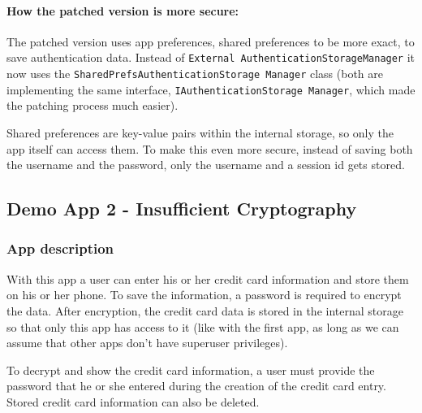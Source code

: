 \paragraph{How the patched version is more secure:}
The patched version uses app preferences, shared preferences to be more exact, to save authentication data. Instead of \texttt{External AuthenticationStorageManager} it now uses the \texttt{SharedPrefsAuthenticationStorage Manager} class (both are implementing the same interface, \texttt{IAuthenticationStorage Manager}, which made the patching process much easier).

Shared preferences are key-value pairs within the internal storage, so only the app itself can access them. To make this even more secure, instead of saving both the username and the password, only the username and a session id gets stored. 



\subsection{Demo App 2 - Insufficient Cryptography}\label{sec:app1}
\subsubsection{App description}
With this app a user can enter his or her credit card information and store them on his or her phone. To save the information, a password is required to encrypt the data. After encryption, the credit card data is stored in the internal storage so that only this app has access to it (like with the first app, as long as we can assume that other apps don't have superuser privileges).

To decrypt and show the credit card information, a user must provide the password that he or she entered during the creation of the credit card entry. Stored credit card information can also be deleted.

